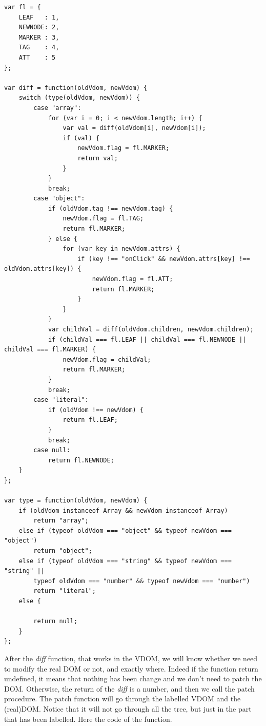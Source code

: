 \documentclass[10pt]{article}
\begin{document}
\begin{lstlisting}[caption=\textit{diff} function]
var fl = {
    LEAF   : 1,
    NEWNODE: 2,	
   	MARKER : 3,    
   	TAG    : 4,
    ATT    : 5
};

var diff = function(oldVdom, newVdom) {
    switch (type(oldVdom, newVdom)) {
        case "array":
            for (var i = 0; i < newVdom.length; i++) {
                var val = diff(oldVdom[i], newVdom[i]);
                if (val) {
                    newVdom.flag = fl.MARKER;
                    return val;
                }
            }
            break;
        case "object":
            if (oldVdom.tag !== newVdom.tag) {
                newVdom.flag = fl.TAG;
                return fl.MARKER;
            } else {
                for (var key in newVdom.attrs) {
                    if (key !== "onClick" && newVdom.attrs[key] !== oldVdom.attrs[key]) {
                        newVdom.flag = fl.ATT;
                        return fl.MARKER;
                    }
                }
            }
            var childVal = diff(oldVdom.children, newVdom.children);
            if (childVal === fl.LEAF || childVal === fl.NEWNODE || childVal === fl.MARKER) {
                newVdom.flag = childVal;
                return fl.MARKER;
            }
            break;
        case "literal":
            if (oldVdom !== newVdom) {
                return fl.LEAF;
            }
            break;
        case null:
            return fl.NEWNODE;
    }
};

var type = function(oldVdom, newVdom) {
    if (oldVdom instanceof Array && newVdom instanceof Array)
        return "array";
    else if (typeof oldVdom === "object" && typeof newVdom === "object")
        return "object";
    else if (typeof oldVdom === "string" && typeof newVdom === "string" ||
        typeof oldVdom === "number" && typeof newVdom === "number")
        return "literal";
    else {

        return null;
    }
};
\end{lstlisting}
After the \textit{diff} function, that works in the VDOM, we will know whether we need to modify the real DOM or not, and exactly where. Indeed if the function return undefined, it means that nothing has been change and we don't need to patch the DOM. Otherwise, the return of the \textit{diff} is a number, and then we call the patch procedure. The patch function will go through the labelled VDOM and the (real)DOM. Notice that it will not go through all the tree, but just in the part that has been labelled. Here the code of the function.   
\end{document}
